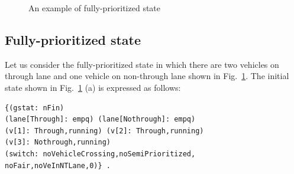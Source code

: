 \documentclass[10pt, conference, compsocconf]{IEEEtran}
\begin{document}
\begin{figure}[tb]
\begin{center}
\end{center}
\caption{An example of fully-prioritized state}
\label{fully_fig}
\end{figure}

\subsection{Fully-prioritized state}

Let us consider the fully-prioritized state in which there are two vehicles on through lane and one vehicle on non-through lane shown in Fig.~\ref{fully_fig}. 
The initial state shown in Fig.~\ref{fully_fig} (a) is expressed as follows:
 
\begin{footnotesize}
\begin{verbatim}
{(gstat: nFin) 
(lane[Through]: empq) (lane[Nothrough]: empq) 
(v[1]: Through,running) (v[2]: Through,running)
(v[3]: Nothrough,running)
(switch: noVehicleCrossing,noSemiPrioritized,
noFair,noVeInNTLane,0)} .
\end{verbatim}
\end{footnotesize}

\end{document}
